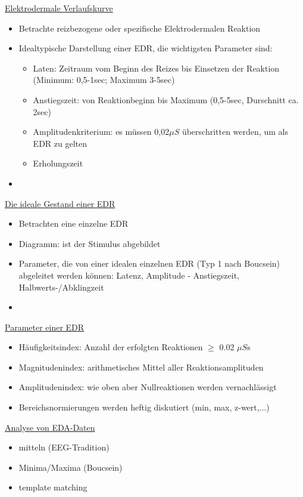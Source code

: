 \documentclass[a4paper,10pt,oneside]{article}
\begin{document}
\underline{Elektrodermale Verlaufskurve} \\
	\begin{itemize}
		\item Betrachte reizbezogene oder spezifische Elektrodermalen Reaktion
		\item Idealtypische Darstellung einer EDR, die wichtigsten Parameter sind:
			\begin{itemize}
				\item Laten: Zeitraum vom Beginn des Reizes bis Einsetzen der Reaktion (Minimum: 0,5-1sec; Maximum 3-5sec)
				\item Anstiegszeit: von Reaktionbeginn bis Maximum (0,5-5sec, Durschnitt ca. 2sec)
				\item Amplitudenkriterium: es müssen 0,02$\mu S$ überschritten werden, um als EDR zu gelten
				\item Erholungszeit 
			\end{itemize}
		\item[] %
	\end{itemize}
	
\underline{Die ideale Gestand einer EDR} \\
	\begin{itemize}
		\item Betrachten eine einzelne EDR
		\item Diagramm: ist der Stimulus abgebildet
		\item Parameter, die von einer idealen einzelnen EDR (Typ 1 nach Boucsein) abgeleitet werden können: Latenz, Amplitude - Anstiegszeit, Halbwerts-/Abklingzeit
		\item[] %
	\end{itemize}

\underline{Parameter einer EDR} \\
	\begin{itemize}
		\item Häufigkeitsindex: Anzahl der erfolgten Reaktionen $\geq$ 0.02 $\mu S$s
		\item Magnitudenindex: arithmetisches Mittel aller Reaktionsamplituden
		\item Amplitudenindex: wie oben aber Nullreaktionen werden vernachlässigt
		\item Bereichsnormierungen werden heftig diskutiert (min, max, z-wert,...)
	\end{itemize}
	
\underline{Analyse von EDA-Daten} \\
	\begin{itemize}
		\item mitteln (EEG-Tradition)
		\item Minima/Maxima (Boucsein)
		\item template matching
	\end{itemize}
\end{document}
